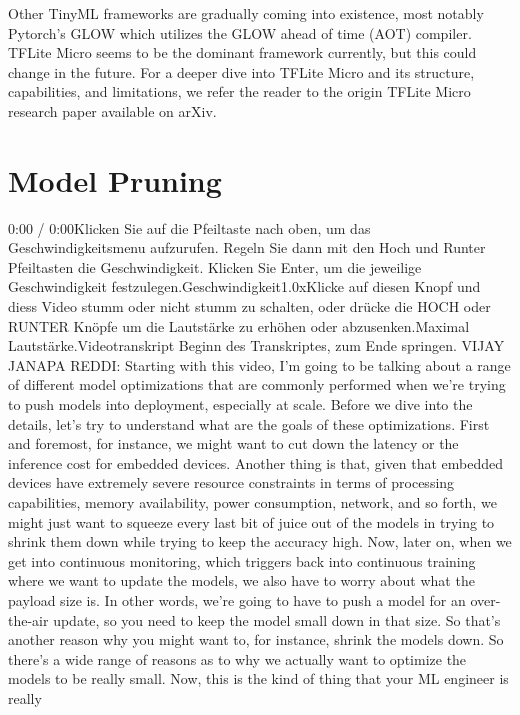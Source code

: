 {{{{{Other TinyML frameworks are gradually coming into existence, most notably Pytorch’s GLOW which utilizes the GLOW ahead of time (AOT) compiler. TFLite Micro seems to be the dominant framework currently, but this could change in the future. For a deeper dive into TFLite Micro and its structure, capabilities, and limitations, we refer the reader to the origin TFLite Micro research paper available on arXiv.  


\section{Model Pruning}

    0:00 / 0:00Klicken Sie auf die Pfeiltaste nach oben, um das Geschwindigkeitsmenu aufzurufen. Regeln Sie dann mit den Hoch und Runter Pfeiltasten die Geschwindigkeit. Klicken Sie Enter, um die jeweilige Geschwindigkeit festzulegen.Geschwindigkeit1.0xKlicke auf diesen Knopf und diess Video stumm oder nicht stumm zu schalten, oder drücke die HOCH oder RUNTER Knöpfe um die Lautstärke zu erhöhen oder abzusenken.Maximal Lautstärke.Videotranskript
    Beginn des Transkriptes, zum Ende springen.
    VIJAY JANAPA REDDI: Starting with this video,
    I'm going to be talking about a range of different model optimizations
    that are commonly performed when we're trying to push models
    into deployment, especially at scale.
    Before we dive into the details, let's try
    to understand what are the goals of these optimizations.
    First and foremost, for instance, we might
    want to cut down the latency or the inference cost for embedded devices.
    Another thing is that, given that embedded devices have
    extremely severe resource constraints in terms of processing capabilities,
    memory availability, power consumption, network, and so forth,
    we might just want to squeeze every last bit of juice out of the models
    in trying to shrink them down while trying to keep the accuracy high.
    Now, later on, when we get into continuous monitoring, which
    triggers back into continuous training where we want to update the models,
    we also have to worry about what the payload size is.
    In other words, we're going to have to push
    a model for an over-the-air update, so you need to keep the model small down
    in that size.
    So that's another reason why you might want to, for instance,
    shrink the models down.
    So there's a wide range of reasons as to why we actually
    want to optimize the models to be really small.
    Now, this is the kind of thing that your ML engineer is really
}}}}}
